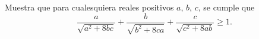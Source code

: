 Muestra que para cualesquiera reales positivos $a$, $b$, $c$, se cumple que
\[ \frac{a}{\sqrt{a^2 + 8bc}} + \frac{b}{\sqrt{b^2 + 8ca}} + \frac{c}{\sqrt{c^2 + 8ab}} \geq 1. \]